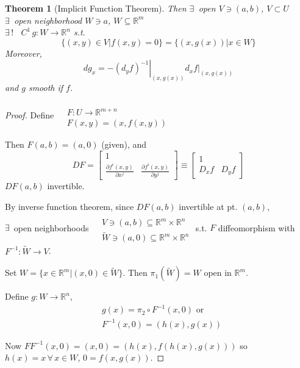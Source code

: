 \documentclass[10pt]{amsart}
\newtheorem{theorem}{Theorem}
\begin{document}
\begin{multicols*}{2}
\begin{theorem}[Implicit Function Theorem]
Then $\exists \, $ open $V \ni (a,b)$, $V \subset U$ \\
\phantom{Then} $\exists \, $ open neighborhood $W \ni a$, $W \subseteq \mathbb{R}^m$ \\
\phantom{Then} $\exists \, !$ \, $C^1 \, g:W \to \mathbb{R}^n$ s.t.
\[
\lbrace (x,y) \in V | f(x,y) =0 \rbrace = \lbrace (x,g(x)) | x \in W \rbrace
\]
Moreover,
\[
dg_x = - \left. (d_yf)^{-1} \right|_{(x,g(x))} \left. d_x f\right|_{(x,g(x))}
\]
and $g$ smooth if $f$.  
\end{theorem}

\begin{proof}
  Define $\begin{aligned} & \quad \\
    & F: U \to \mathbb{R}^{m+n}   \\
    & F(x,y) = (x,f(x,y)) \end{aligned}$

Then $F(a,b) = (a,0)$ (given), and 
\[
DF = \left[ \begin{matrix} 1 & \\ 
    \frac{ \partial f^i(x,y)}{ \partial x^j} & \frac{ \partial f^i(x,y) }{ \partial y^j } \end{matrix} \right] \equiv \left[ \begin{matrix} 1 & \\
    D_xf & D_yf \end{matrix} \right]
\]
$DF(a,b)$ invertible.  

By inverse function theorem, since $DF(a,b)$ invertible at pt. $(a,b)$, \\
$\exists \, $ open neighborhoods $\begin{aligned} & \quad \\
  & V \ni (a,b) \subseteq \mathbb{R}^m \times \mathbb{R}^n \\
  & \widetilde{W} \ni (a,0) \subseteq \mathbb{R}^m \times \mathbb{R}^n \end{aligned}$ s.t. $F$ diffeomorphism with $F^{-1}: \widetilde{W} \to V$. 

Set $W = \lbrace x \in \mathbb{R}^m | (x,0) \in \widetilde{W}\rbrace$.  Then $\pi_1(\widetilde{W}) =W$ open in $\mathbb{R}^m$.  

Define $g:W\to \mathbb{R}^n$, 
\[
\begin{aligned}
  & g(x) = \pi_2 \circ F^{-1}(x,0) \text{ or } \\ 
  & F^{-1}(x,0) = (h(x),g(x))
\end{aligned}
\]

Now $FF^{-1}(x,0) = (x,0) = (h(x), f(h(x),g(x)) )$ so $h(x)=x \, \forall \, x \in W$, $0 = f(x,g(x))$.  


\end{proof}
\end{multicols*}
\end{document}
